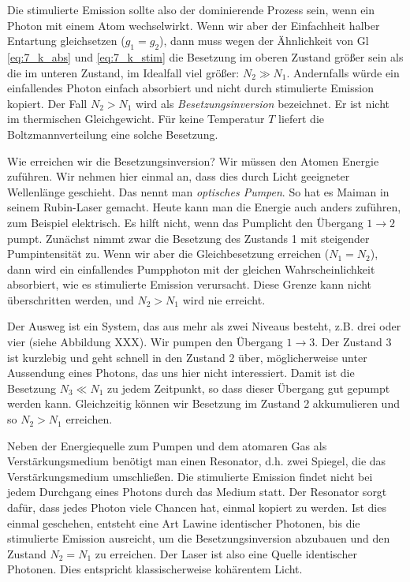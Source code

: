 Die stimulierte Emission sollte also der dominierende Prozess sein, wenn ein Photon mit einem Atom wechselwirkt. Wenn wir aber der Einfachheit halber Entartung gleichsetzen ($g_1 = g_2$), dann muss wegen der Ähnlichkeit von Gl \ref{eq:7_k_abs} und \ref{eq:7_k_stim} die Besetzung im oberen Zustand größer sein als die im unteren Zustand, im Idealfall viel größer: $N_2 \gg N_1$. Andernfalls würde ein einfallendes Photon einfach absorbiert und nicht durch stimulierte Emission kopiert. Der Fall $N_2 > N_1$ wird als \emph{Besetzungsinversion} bezeichnet. Er ist nicht im thermischen Gleichgewicht. Für keine Temperatur $T$ liefert die Boltzmannverteilung eine solche Besetzung.

Wie erreichen wir die Besetzungsinversion? Wir müssen den Atomen Energie zuführen. Wir nehmen hier einmal an, dass dies durch Licht geeigneter Wellenlänge geschieht. Das nennt man \emph{optisches Pumpen}. So hat es Maiman in seinem Rubin-Laser gemacht. Heute kann man die Energie auch anders zuführen, zum Beispiel elektrisch. Es hilft nicht, wenn das Pumplicht den Übergang $1 \rightarrow 2$ pumpt. Zunächst nimmt zwar die Besetzung des Zustands 1 mit steigender Pumpintensität zu. Wenn wir aber die Gleichbesetzung erreichen ($N_1 = N_2$), dann wird ein einfallendes Pumpphoton mit der gleichen Wahrscheinlichkeit absorbiert, wie es stimulierte Emission verursacht. Diese Grenze kann nicht überschritten werden, und $N_2 > N_1$ wird nie erreicht.

Der Ausweg ist ein System, das aus mehr als zwei Niveaus besteht, z.B. drei oder vier (siehe Abbildung XXX). Wir pumpen den Übergang $1 \rightarrow 3$. Der Zustand 3 ist kurzlebig und geht schnell in den Zustand 2 über, möglicherweise unter Aussendung eines Photons, das uns hier nicht interessiert. Damit ist die Besetzung $N_3 \ll N_1$ zu jedem Zeitpunkt, so dass dieser Übergang gut gepumpt werden kann. Gleichzeitig können wir  Besetzung im Zustand 2 akkumulieren und so $N_2 > N_1$ erreichen.


Neben der Energiequelle zum Pumpen und dem atomaren Gas als Verstärkungsmedium benötigt man einen Resonator, d.h. zwei Spiegel, die das Verstärkungsmedium umschließen. Die stimulierte Emission findet nicht bei jedem Durchgang eines Photons durch das Medium statt.  Der Resonator sorgt dafür, dass jedes Photon viele Chancen hat, einmal kopiert zu werden. Ist dies einmal geschehen, entsteht eine Art Lawine identischer Photonen, bis die stimulierte Emission ausreicht, um die Besetzungsinversion abzubauen und den Zustand $N_2 = N_1$ zu erreichen. Der Laser ist also eine Quelle identischer Photonen. Dies entspricht klassischerweise kohärentem Licht.


